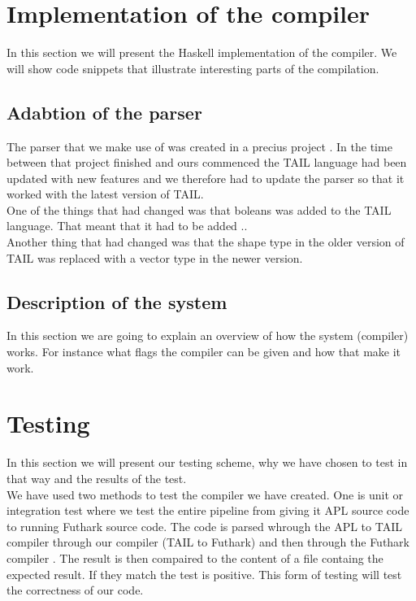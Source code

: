 \documentclass[11pt]{article}
\begin{document}
\section{Implementation of the compiler}

In this section we will present the Haskell implementation of the compiler. We will show code snippets that illustrate interesting parts of the compilation.

\subsection{Adabtion of the parser}

The parser that we make use of was created in a precius project \cite{APLACC}. In the time between that project finished and ours commenced the TAIL language had been updated with new features and we therefore had to update the parser so that it worked with the latest version of TAIL.\\

One of the things that had changed was that boleans was added to the TAIL language. That meant that it had to be added ..\\

Another thing that had changed was that the shape type in the older version of TAIL was replaced with a vector type in the newer version.\\

\subsection{Description of the system}

In this section we are going to explain an overview of how the system (compiler) works. For instance what flags the compiler can be given and how that make it work. 


\section{Testing}
In this section we will present our testing scheme, why we have chosen to test in that way and the results of the test.\\


We have used two methods to test the compiler we have created. One is unit or integration test where we test the entire pipeline from giving it APL source code to running Futhark source code. The code is parsed whrough the APL to TAIL compiler \cite{ElsmanDybdal:Array:2014} through our compiler (TAIL to Futhark) and then through the Futhark compiler \cite{TroelsHenriksen}. The result is then compaired to the content of a file containg the expected result. If they match the test is positive. This form of testing will test the correctness of our code. \\
\end{document}
